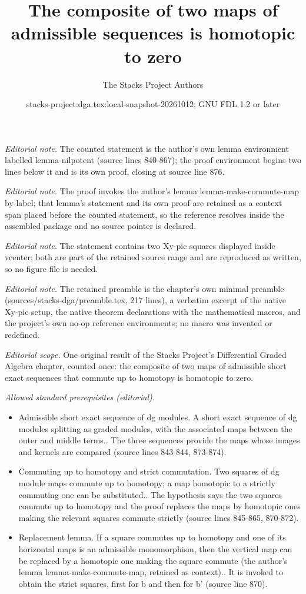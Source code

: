\documentclass{stacks-project}
\title{The composite of two maps of admissible sequences is homotopic to zero}
\author{The Stacks Project Authors}
\date{stacks-project:dga.tex:local-snapshot-20261012; GNU FDL 1.2 or later}
\theoremstyle{plain}
\theoremstyle{definition}
\theoremstyle{remark}
\numberwithin{equation}{subsection}
\begin{document}
\maketitle
\noindent\textit{Editorial note.} The counted statement is the author's own lemma environment labelled lemma-nilpotent (source lines 840-867); the proof environment begins two lines below it and is its own proof, closing at source line 876.\par\medskip
\noindent\textit{Editorial note.} The proof invokes the author's lemma lemma-make-commute-map by label; that lemma's statement and its own proof are retained as a context span placed before the counted statement, so the reference resolves inside the assembled package and no source pointer is declared.\par\medskip
\noindent\textit{Editorial note.} The statement contains two Xy-pic squares displayed inside vcenter; both are part of the retained source range and are reproduced as written, so no figure file is needed.\par\medskip
\noindent\textit{Editorial note.} The retained preamble is the chapter's own minimal preamble (sources/stacks-dga/preamble.tex, 217 lines), a verbatim excerpt of the native Xy-pic setup, the native theorem declarations with the mathematical macros, and the project's own no-op reference environments; no macro was invented or redefined.\par\medskip
\noindent\textit{Editorial scope.} One original result of the Stacks Project's Differential Graded Algebra chapter, counted once: the composite of two maps of admissible short exact sequences that commute up to homotopy is homotopic to zero.\par\medskip
\noindent\textit{Allowed standard prerequisites (editorial).}\begin{itemize}
\item Admissible short exact sequence of dg modules. A short exact sequence of dg modules splitting as graded modules, with the associated maps between the outer and middle terms.. The three sequences provide the maps whose images and kernels are compared (source lines 843-844, 873-874).
\item Commuting up to homotopy and strict commutation. Two squares of dg module maps commute up to homotopy; a map homotopic to a strictly commuting one can be substituted.. The hypothesis says the two squares commute up to homotopy and the proof replaces the maps by homotopic ones making the relevant squares commute strictly (source lines 845-865, 870-872).
\item Replacement lemma. If a square commutes up to homotopy and one of its horizontal maps is an admissible monomorphism, then the vertical map can be replaced by a homotopic one making the square commute (the author's lemma lemma-make-commute-map, retained as context).. It is invoked to obtain the strict squares, first for b and then for b' (source line 870).
\end{itemize}\medskip
\end{document}
